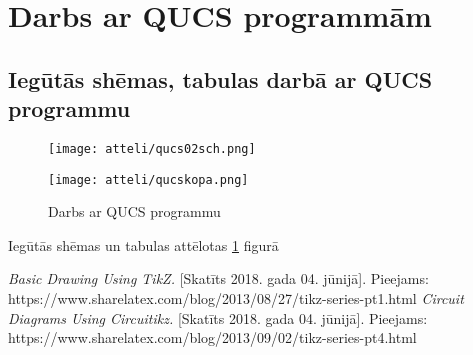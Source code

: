 \documentclass{report}
\begin{document}
\section{Darbs ar QUCS programmām}

\subsection{Iegūtās shēmas, tabulas darbā ar QUCS programmu}
\begin{figure}[ht]
\caption{Darbs ar QUCS programmu}
\label{i:qucs}
\texttt{[image: atteli/qucs02sch.png]}

\texttt{[image: atteli/qucskopa.png]}
\end{figure}
Iegūtās shēmas un tabulas attēlotas \ref{i:qucs} figurā

\begin{thebibliography}{9}
\textit{Basic Drawing Using TikZ.} [Skatīts 2018. gada 04. jūnijā].
Pieejams: 
https://www.sharelatex.com/blog/2013/08/27/tikz-series-pt1.html
\textit{Circuit Diagrams Using Circuitikz.} [Skatīts 2018. gada 04. jūnijā].
Pieejams: 
https://www.sharelatex.com/blog/2013/09/02/tikz-series-pt4.html

 
\end{thebibliography}
\end{document}
